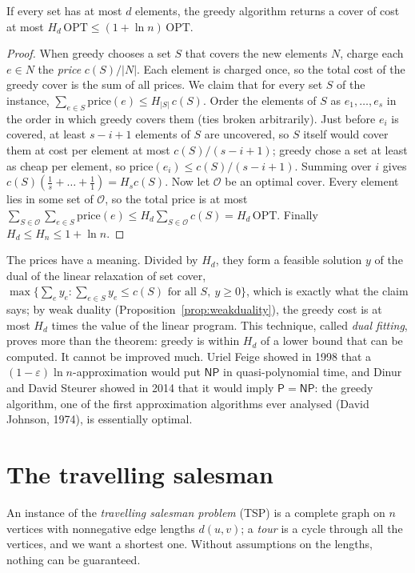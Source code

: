 \begin{theorem}\label{thm:setcover}
If every set has at most $d$ elements, the greedy algorithm returns a cover of cost at most $H_d\,\mathrm{OPT}\le(1+\ln n)\,\mathrm{OPT}$.
\end{theorem}
\begin{proof}
When greedy chooses a set $S$ that covers the new elements $N$, charge each $e\in N$ the \emph{price} $c(S)/|N|$. Each element is charged once, so the total cost of the greedy cover is the sum of all prices. We claim that for every set $S$ of the instance, $\sum_{e\in S}\mathrm{price}(e)\le H_{|S|}\,c(S)$.
Order the elements of $S$ as $e_1,\dots,e_s$ in the order in which greedy covers them (ties broken arbitrarily). Just before $e_i$ is covered, at least $s-i+1$ elements of $S$ are uncovered, so $S$ itself would cover them at cost per element at most $c(S)/(s-i+1)$; greedy chose a set at least as cheap per element, so $\mathrm{price}(e_i)\le c(S)/(s-i+1)$. Summing over $i$ gives $c(S)(\frac1s+\dots+\frac11)=H_sc(S)$.
Now let $\mathcal O$ be an optimal cover. Every element lies in some set of $\mathcal O$, so the total price is at most $\sum_{S\in\mathcal O}\sum_{e\in S}\mathrm{price}(e)\le H_d\sum_{S\in\mathcal O}c(S)=H_d\,\mathrm{OPT}$. Finally $H_d\le H_n\le1+\ln n$.
\end{proof}

The prices have a meaning. Divided by $H_d$, they form a feasible solution $y$ of the dual of the linear relaxation of set cover, $\max\{\sum_ey_e:\sum_{e\in S}y_e\le c(S)\text{ for all }S,\ y\ge0\}$, which is exactly what the claim says; by weak duality (Proposition~\ref{prop:weakduality}), the greedy cost is at most $H_d$ times the value of the linear program. This technique, called \emph{dual fitting}, proves more than the theorem: greedy is within $H_d$ of a lower bound that can be computed. It cannot be improved much. Uriel Feige showed in 1998 that a $(1-\varepsilon)\ln n$-approximation would put $\mathsf{NP}$ in quasi-polynomial time, and Dinur and David Steurer showed in 2014 that it would imply $\mathsf P=\mathsf{NP}$:
the greedy algorithm, one of the first approximation algorithms ever analysed (David Johnson, 1974), is essentially optimal.

\section{The travelling salesman}\label{sec:tsp}

An instance of the \emph{travelling salesman problem} (TSP) is a complete graph on $n$ vertices with nonnegative edge lengths $d(u,v)$; a \emph{tour} is a cycle through all the vertices, and we want a shortest one. Without assumptions on the lengths, nothing can be guaranteed.

